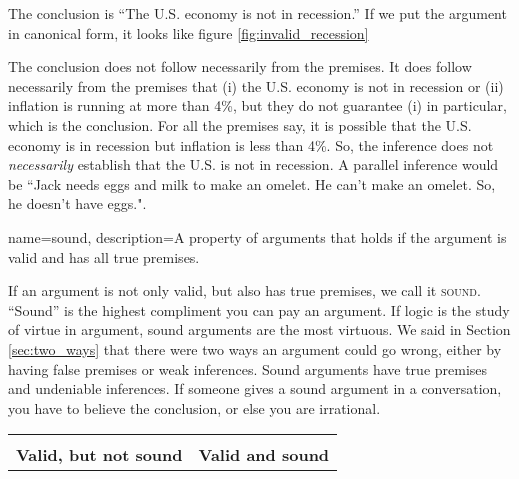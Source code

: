 The conclusion is ``The U.S. economy is not in recession.'' If we put the argument in canonical form, it looks like figure \ref{fig:invalid_recession}

\begin{kormanize}
\end{kormanize}

The conclusion does not follow necessarily from the premises. It does follow necessarily from the premises that (i) the U.S. economy is not in recession or (ii) inflation is running at more than 4\%, but they do not guarantee (i) in particular, which is the conclusion. For all the premises say, it is possible that the U.S. economy is in recession but inflation is less than 4\%. So, the inference does not \textit{necessarily} establish that the U.S. is not in recession. A parallel inference would be ``Jack needs eggs and milk to make an omelet. He can't make an omelet. So, he doesn't have eggs.".

{
name=sound,
description={A property of arguments that holds if the argument is valid and has all true premises.}
}

If an argument is not only valid, but also has true premises, we call it \textsc{\gls{sound}}. \label{def:sound} ``Sound'' is the highest compliment you can pay an argument. If logic is the study of virtue in argument, sound arguments are the most virtuous. We said in Section \ref{sec:two_ways} that there were two ways an argument could go wrong, either by having false premises or weak inferences. Sound arguments have true premises and undeniable inferences. If someone gives a sound argument in a conversation, you have to believe the conclusion, or else you are irrational.

\begin{longtabu}{X[1,c] X[1,c]}
\begin{kormanize}
\end{kormanize}
&

\begin{kormanize}
\end{kormanize}
\\
\textbf{Valid, but not sound}&
\textbf{Valid and sound}
\end{longtabu}

